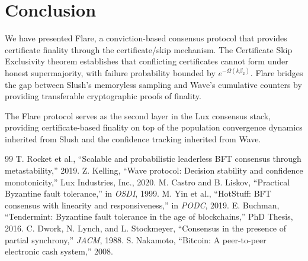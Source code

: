 \section{Conclusion}

\label{sec:conclusion}

We have presented Flare, a conviction-based consensus protocol that provides certificate
finality through the certificate/skip mechanism. The Certificate Skip Exclusivity theorem
establishes that conflicting certificates cannot form under honest supermajority, with
failure probability bounded by $e^{-\Omega(k\beta_2)}$. Flare bridges the gap between
Slush's memoryless sampling and Wave's cumulative counters by providing transferable
cryptographic proofs of finality.

The Flare protocol serves as the second layer in the Lux consensus stack, providing
certificate-based finality on top of the population convergence dynamics inherited from
Slush and the confidence tracking inherited from Wave.

\begin{thebibliography}{99}
 T. Rocket et al., ``Scalable and probabilistic leaderless BFT consensus through metastability,'' 2019.
 Z. Kelling, ``Wave protocol: Decision stability and confidence monotonicity,'' Lux Industries, Inc., 2020.
 M. Castro and B. Liskov, ``Practical Byzantine fault tolerance,'' in \emph{OSDI}, 1999.
 M. Yin et al., ``HotStuff: BFT consensus with linearity and responsiveness,'' in \emph{PODC}, 2019.
 E. Buchman, ``Tendermint: Byzantine fault tolerance in the age of blockchains,'' PhD Thesis, 2016.
 C. Dwork, N. Lynch, and L. Stockmeyer, ``Consensus in the presence of partial synchrony,'' \emph{JACM}, 1988.
 S. Nakamoto, ``Bitcoin: A peer-to-peer electronic cash system,'' 2008.
\end{thebibliography}

